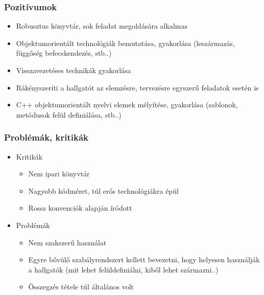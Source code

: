 \documentclass[11pt]{beamer}
\begin{document}
\begin{frame}
	\frametitle{Pozitívumok}
	\begin{itemize}
		\item Robusztus könyvtár, sok feladat megoldására alkalmas
		\item Objektumorientált technológiák bemutatása, gyakorlása (leszármazás, függőség befecskendezés, stb..) 
		\vspace*{8px}
		\item Visszavezetéses technikák gyakorlása
		\vspace*{8px}
		\item Rákényszeríti a hallgatót az elemzésre, tervezésre egyszerű feladatok esetén is
		\item C++ objektumorientált nyelvi elemek mélyítése, gyakorlása (sablonok, metódusok felül definiálása, stb..)
		
	\end{itemize}
\end{frame}

\begin{frame}
	\frametitle{Problémák, kritikák}
	\begin{itemize}
		\item Kritikák
		\begin{itemize}
			\item Nem ipari könyvtár
			\item Nagyobb kódméret, túl erős technológiákra épül
			\item Rossz konvenciók alapján íródott
		\end{itemize}
		\item Problémák
		\begin{itemize}
			\item Nem szakszerű használat
			\item Egyre bővülő szabályrendszert kellett  bevezetni, hogy helyesen használják a hallgatók (mit lehet felüldefiniálni, kiből lehet származni..)
			\item Összegzés tétele túl általános volt
		\end{itemize}
	\end{itemize}
\end{frame}
\end{document}
